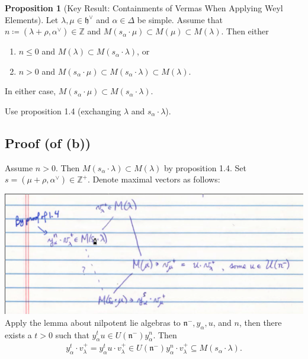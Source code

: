 \documentclass[11pt]{scrartcl}
\theoremstyle{definition}
\theoremstyle{theorem}
\newtheorem{proposition}[theorem]{Proposition}
\theoremstyle{proof}
\newenvironment{proof}
{\pushQED{$\qed$}\pf}
{\par\popQED\endpf}
\theoremstyle{definition}
\theoremstyle{break}
\theoremstyle{problem}
\providecommand{\tightlist}{%
  \setlength{\itemsep}{0pt}\setlength{\parskip}{0pt}}
\newcommand{\ZZ}[0]{{\mathbb{Z}}}
\newcommand{\definedas}[0]{\coloneqq}
\newcommand{\dual}[0]{^\vee}
\newcommand{\lieh}[0]{{\mathfrak{h}}}
\newcommand{\lien}[0]{{\mathfrak{n}}}
\renewcommand{\qed}[0]{\hfill\blacksquare}
\begin{document}
\begin{proposition}[Key Result: Containments of Vermas When Applying Weyl Elements]

Let \(\lambda, \mu \in \lieh\dual\) and \(\alpha\in\Delta\) be simple.
Assume that \(n\definedas (\lambda + \rho, \alpha\dual) \in \ZZ\) and
\(M(s_\alpha \cdot \mu) \subset M(\mu) \subset M(\lambda)\). Then either

\begin{enumerate}
\def\labelenumi{\alph{enumi}.}
\tightlist
\item
  \(n\leq 0\) and \(M(\lambda) \subset M(s_\alpha \cdot \lambda)\), or
\item
  \(n>0\) and
  \(M(s_\alpha \cdot \mu) \subset M(s_\alpha \cdot \lambda) \subset M(\lambda)\).
\end{enumerate}

In either case,
\(M(s_\alpha \cdot \mu) \subset M(s_\alpha \cdot \lambda)\).\end{proposition}

\begin{proof}[of (a)]

Use proposition 1.4 (exchanging \(\lambda\) and
\(s_\alpha \cdot \lambda\)).\end{proof}

\hypertarget{proof-of-b}{%
\subsection{Proof (of (b))}\label{proof-of-b}}

Assume \(n>0\). Then \(M(s_\alpha \cdot \lambda) \subset M(\lambda)\) by
proposition 1.4. Set \(s = (\mu + \rho, \alpha\dual) \in \ZZ^+\). Denote
maximal vectors as follows:

\includegraphics{figures/2020-03-30-09:29.png}\\

Apply the lemma about nilpotent lie algebras to
\(\lien^-, y_\alpha, u\), and \(n\), then there exists a \(t>0\) such
that \(y_\alpha^t u \in U(\lien^-) y_\alpha^n\). Then
\begin{align*}\label{star}
y_\alpha^t \cdot v_\lambda^+ = y_\alpha^t u \cdot v_\lambda^+ \in U(\lien^-) y_\alpha^n \cdot v_\lambda^+ \subseteq M(s_\alpha \cdot \lambda)
.\end{align*}
\end{document}
